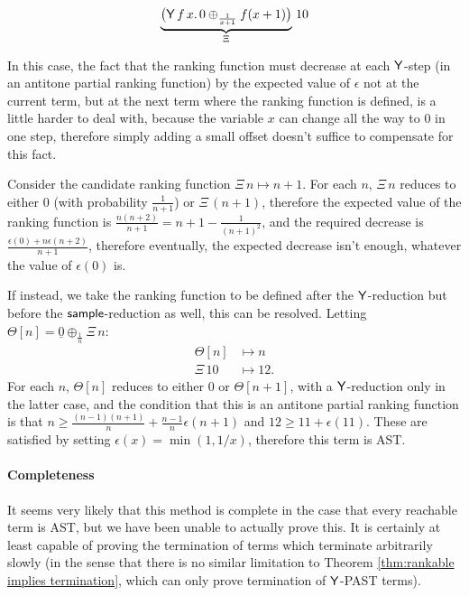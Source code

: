 \begin{example}
\label{ex:escaping spline}\citep[\S 5.4]{DBLP:journals/pacmpl/McIverMKK18}
\[
\underbrace{\big
(\mathsf{Y} \, f \, x . \,
0 \oplus_{\frac{1}{x+1}} f(x + 1) \big)}_{\Xi} 
\, 10
\]

In this case, the fact that the ranking function must decrease at each $\mathsf{Y}$-step (in an antitone partial ranking function) by the expected value of $\epsilon$ not at the current term, but at the next term where the ranking function is defined, is a little harder to deal with, because the variable $x$ can change all the way to $0$ in one step, therefore simply adding a small offset doesn't suffice to compensate for this fact.

Consider the candidate ranking function $\Xi \, n \mapsto n + 1$. For each $n$, $\Xi \, n$ reduces to either $0$ (with probability $\frac 1 {n + 1}$) or $\Xi \, (n + 1)$, therefore the expected value of the ranking function is $\frac{n(n+2)}{n+1} = n + 1 - \frac 1 {(n+1)^2}$, and the required decrease is $\frac{\epsilon(0) + n \epsilon(n + 2)}{n + 1}$, therefore eventually, the expected decrease isn't enough, whatever the value of $\epsilon(0)$ is.

If instead, we take the ranking function to be defined after the $\mathsf{Y}$-reduction but before the $\mathsf{sample}$-reduction as well, this can be resolved. Letting $\Theta[n] = \underline 0 \oplus_{\frac 1 n} \Xi \, n$:
\begin{align*}
\Theta[n] &\mapsto n \\
\Xi \, 10 & \mapsto 12.
\end{align*}
For each $n$, $\Theta[n]$ reduces to either $0$ or $\Theta[n+1]$, with a $\mathsf{Y}$-reduction only in the latter case, and the condition that this is an antitone partial ranking function is that $n \geq \frac{(n-1)(n+1)}{n} + \frac{n-1}{n} \epsilon(n+1)$ and $12 \geq 11 + \epsilon(11)$. These are satisfied by setting $\epsilon(x) = \min(1, 1/x)$, therefore this term is AST.
\end{example}

\paragraph*{Completeness}
It seems very likely that this method is complete in the case that every reachable term is AST, but we have been unable to actually prove this. It is certainly at least capable of proving the termination of terms which terminate arbitrarily slowly (in the sense that there is no similar limitation to Theorem \ref{thm:rankable implies termination}, which can only prove termination of $\mathsf{Y}$-PAST terms).

